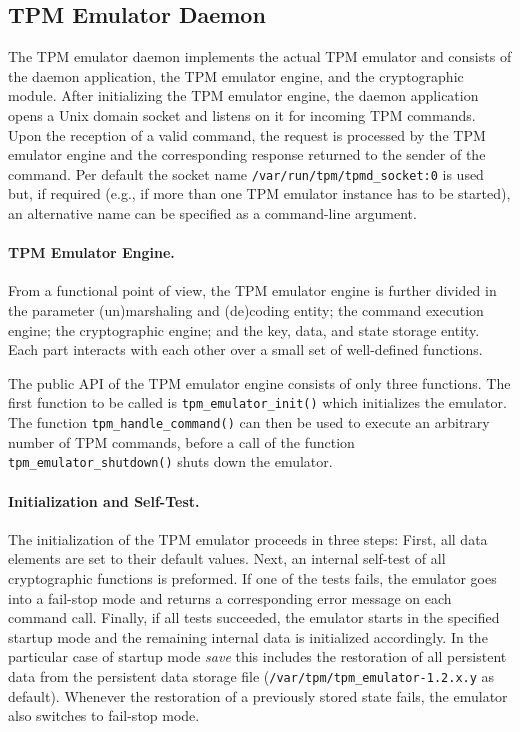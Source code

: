 \documentclass[runningheads]{llncs}
\newcommand{\file}[1]{\small\texttt{#1}\normalsize}
\newcommand{\func}[1]{\small\texttt{#1}\normalsize}
\begin{document}
\subsection{TPM Emulator Daemon}
The TPM emulator daemon implements the actual TPM emulator and consists of
the daemon application, the TPM emulator engine, and the cryptographic module.
After initializing the TPM emulator engine, the daemon application opens a
Unix domain socket and listens on it for incoming TPM commands. Upon the
reception of a valid command, the request is processed by the TPM emulator
engine and the corresponding response returned to the sender of the command.
Per default the socket name \file{/var/run/tpm/tpmd\_socket:0} is used but,
if required (e.g., if more than one TPM emulator instance has to be started),
an alternative name can be specified as a command-line argument.

\paragraph{TPM Emulator Engine.}
From a functional point of view, the TPM emulator engine is further divided
in the parameter (un)marshaling and (de)coding entity; the command execution
engine; the cryptographic engine; and the key, data, and state storage entity.
Each part interacts with each other over a small set of well-defined functions.

The public API of the TPM emulator engine consists of only three functions.
The first function to be called is \func{tpm\_emulator\_init()} which
initializes the emulator. The function \func{tpm\_\-handle\_\-command()} can
then be used to execute an arbitrary number of TPM commands, before a call of
the function \func{tpm\_emulator\_shutdown()} shuts down the emulator.

\paragraph{Initialization and Self-Test.}
The initialization of the TPM emulator proceeds in three steps:
First, all data elements are set to their default values.
Next, an internal self-test of all cryptographic functions
is preformed. If one of the tests fails, the emulator goes into a fail-stop
mode and returns a corresponding error message on each command call. Finally,
if all tests succeeded, the emulator starts in the specified startup mode and
the remaining internal data is initialized accordingly. In the particular case
of startup mode \emph{save} this includes the restoration of all persistent
data from the persistent data storage file
(\file{/var/tpm/tpm\_emulator-1.2.x.y} as default).
Whenever the restoration of a previously stored state fails, the emulator
also switches to fail-stop mode.
\end{document}
